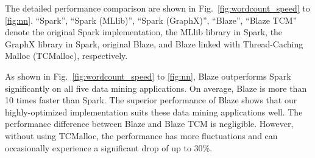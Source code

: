 The detailed performance comparison are shown in Fig.~\ref{fig:wordcount_speed} to \ref{fig:nn}.
``Spark'', ``Spark (MLlib)'', ``Spark (GraphX)'', ``Blaze'', ``Blaze TCM'' denote the original Spark implementation, the MLlib library in Spark, the GraphX library in Spark, original Blaze, and Blaze linked with Thread-Caching Malloc (TCMalloc), respectively.

As shown in Fig.~\ref{fig:wordcount_speed} to \ref{fig:nn}, Blaze outperforms Spark significantly on all five data mining applications.
On average, Blaze is more than 10 times faster than Spark.
The superior performance of Blaze shows that our highly-optimized implementation suits these data mining applications well.
The performance difference between Blaze and Blaze TCM is negligible.
However, without using TCMalloc, the performance has more fluctuations and can occasionally experience a significant drop of up to 30\%.

